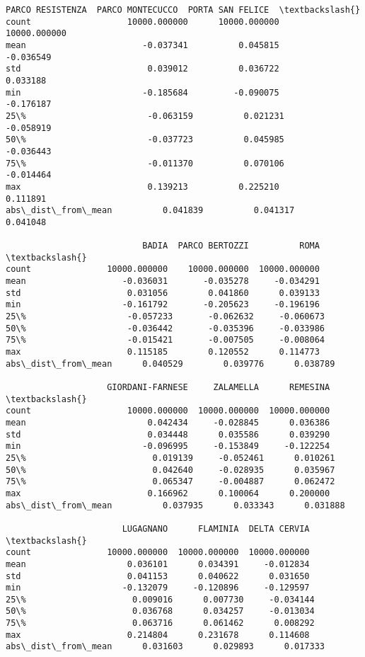 \documentclass[11pt]{article}
\begin{document}
\begin{tcolorbox}[breakable, size=fbox, boxrule=.5pt, pad at break*=1mm, opacityfill=0]
\begin{Verbatim}[commandchars=\\\{\}]
                    PARCO RESISTENZA  PARCO MONTECUCCO  PORTA SAN FELICE  \textbackslash{}
count                   10000.000000      10000.000000      10000.000000
mean                       -0.037341          0.045815         -0.036549
std                         0.039012          0.036722          0.033188
min                        -0.185684         -0.090075         -0.176187
25\%                        -0.063159          0.021231         -0.058919
50\%                        -0.037723          0.045985         -0.036443
75\%                        -0.011370          0.070106         -0.014464
max                         0.139213          0.225210          0.111891
abs\_dist\_from\_mean          0.041839          0.041317          0.041048

                           BADIA  PARCO BERTOZZI          ROMA  \textbackslash{}
count               10000.000000    10000.000000  10000.000000
mean                   -0.036031       -0.035278     -0.034291
std                     0.031056        0.041860      0.039133
min                    -0.161792       -0.205623     -0.196196
25\%                    -0.057233       -0.062632     -0.060673
50\%                    -0.036442       -0.035396     -0.033986
75\%                    -0.015421       -0.007505     -0.008064
max                     0.115185        0.120552      0.114773
abs\_dist\_from\_mean      0.040529        0.039776      0.038789

                    GIORDANI-FARNESE     ZALAMELLA      REMESINA  \textbackslash{}
count                   10000.000000  10000.000000  10000.000000
mean                        0.042434     -0.028845      0.036386
std                         0.034448      0.035586      0.039290
min                        -0.096995     -0.153849     -0.122254
25\%                         0.019139     -0.052461      0.010261
50\%                         0.042640     -0.028935      0.035967
75\%                         0.065347     -0.004887      0.062472
max                         0.166962      0.100064      0.200000
abs\_dist\_from\_mean          0.037935      0.033343      0.031888

                       LUGAGNANO      FLAMINIA  DELTA CERVIA  \textbackslash{}
count               10000.000000  10000.000000  10000.000000
mean                    0.036101      0.034391     -0.012834
std                     0.041153      0.040622      0.031650
min                    -0.132079     -0.120896     -0.129597
25\%                     0.009016      0.007730     -0.034144
50\%                     0.036768      0.034257     -0.013034
75\%                     0.063716      0.061462      0.008292
max                     0.214804      0.231678      0.114608
abs\_dist\_from\_mean      0.031603      0.029893      0.017333


\end{Verbatim}
\end{tcolorbox}
\end{document}
